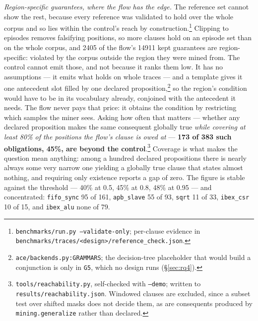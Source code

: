 \emph{Region-specific guarantees, where the flow has the edge.} The reference set cannot show
the rest, because every reference was validated to hold over the whole corpus and so lies
within the control's reach by construction.\footnote{\texttt{benchmarks/run.py --validate-only};
per-clause evidence in \texttt{benchmarks/traces/<design>/reference\_check.json}.} Clipping to
episodes removes falsifying positions, so more clauses hold on an episode set than on the whole
corpus, and 2405 of the flow's 14911 kept guarantees are region-specific: violated by the
corpus outside the region they were mined from. The control cannot emit those, and not because
it ranks them low. It has no assumptions --- it emits what holds on whole traces --- and a
template gives it one antecedent slot filled by one declared
proposition,\footnote{\texttt{ace/backends.py:GRAMMARS}; the decision-tree placeholder that
would build a conjunction is only in \texttt{G5}, which no design runs (\S\ref{sec:rq4}).} so
the region's condition would have to be in its vocabulary already, conjoined with the
antecedent it needs. The flow never pays that price: it obtains the condition by restricting
which samples the miner sees. Asking how often that matters --- whether any declared
proposition makes the same consequent globally true \emph{while covering at least 80\% of the
positions the flow's clause is owed at} --- \textbf{173 of 383 such obligations, 45\%, are
beyond the control}.\footnote{\texttt{tools/reachability.py}, self-checked with \texttt{--demo};
written to \texttt{results/reachability.json}. Windowed clauses are excluded, since a subset
test over shifted masks does not decide them, as are consequents produced by
\texttt{mining.generalize} rather than declared.} Coverage is what makes the question mean
anything: among a hundred declared propositions there is nearly always some very narrow one
yielding a globally true clause that states almost nothing, and requiring only existence
reports a gap of zero. The figure is stable against the threshold --- 40\% at 0.5, 45\% at 0.8,
48\% at 0.95 --- and concentrated: \texttt{fifo\_sync} 95 of 161, \texttt{apb\_slave} 55 of 93,
\texttt{sqrt} 11 of 33, \texttt{ibex\_csr} 10 of 15, and \texttt{ibex\_alu} none of 79.

